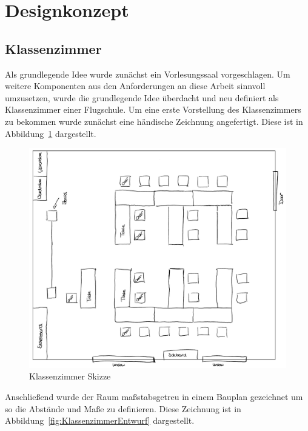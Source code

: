 \section{Designkonzept}



\subsection{Klassenzimmer}
Als grundlegende Idee wurde zunächst ein Vorlesungssaal vorgeschlagen.
Um weitere Komponenten aus den Anforderungen an diese Arbeit sinnvoll umzusetzen,
wurde die grundlegende Idee überdacht und neu definiert als Klassenzimmer einer Flugschule.
\newparagraph
Um eine erste Vorstellung des Klassenzimmers zu bekommen wurde zunächst eine händische Zeichnung angefertigt.
Diese ist in Abbildung~\ref{fig:KlassenzimmerSkizze} dargestellt.
\begin{figure}[H]
  \centering
  \includegraphics[width=1\textwidth]{images/roomModel_OneNote.pdf}
  \caption{Klassenzimmer Skizze}
  \label{fig:KlassenzimmerSkizze}
\end{figure}\noindent
Anschließend wurde der Raum maßstabsgetreu in einem Bauplan gezeichnet um so die Abstände und Maße zu definieren.
Diese Zeichnung ist in Abbildung~\ref{fig:KlassenzimmerEntwurf} dargestellt.

